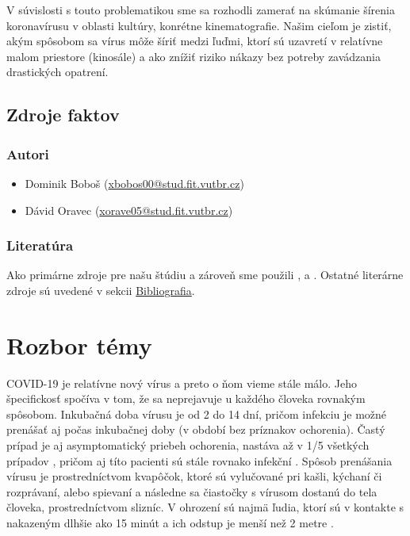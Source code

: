 \documentclass[a4paper, 11pt]{article}
\begin{document}
	\par V súvislosti s touto problematikou sme sa rozhodli zamerať na skúmanie šírenia koronavírusu v oblasti kultúry, konrétne kinematografie. Našim cieľom je zistiť, akým spôsobom sa vírus môže šíriť medzi ľuďmi, ktorí sú uzavretí v relatívne malom priestore (kinosále) a ako znížiť riziko nákazy bez potreby zavádzania drastických opatrení.
	
    	\subsection{Zdroje faktov}
    	    \subsubsection{Autori}
    	    \begin{itemize}
    	        \item Dominik Boboš (\href{mailto:xbobos00@stud.fit.vutbr.cz}{xbobos00@stud.fit.vutbr.cz})
    	        \item Dávid Oravec (\href{mailto:xorave05@stud.fit.vutbr.cz}{xorave05@stud.fit.vutbr.cz})
    	    \end{itemize}
    	    
    	    \subsubsection{Literatúra}
    	    Ako primárne zdroje pre našu štúdiu a zároveň  sme použili \cite{maxbrenner2020}, \cite{charlesconnor2020} a \cite{joslelieveldfrankhelleiset.al.2020}. Ostatné literárne zdroje sú uvedené v sekcii \hyperref[sec:bib]{Bibliografia}.
	    
	\section{Rozbor témy}
	\par COVID-19 je relatívne nový vírus a preto o ňom vieme stále málo. Jeho špecifickosť spočíva v tom, že sa neprejavuje u každého človeka rovnakým spôsobom. Inkubačná doba vírusu je od 2 do 14 dní, pričom infekciu je možné prenášať aj počas inkubačnej doby (v období bez príznakov ochorenia). Častý prípad je aj asymptomatický priebeh ochorenia, nastáva až v 1/5 všetkých prípadov \cite{asymptomatic}, pričom aj títo pacienti sú stále rovnako infekční \cite{asymptomaticinfectious}. Spôsob prenášania vírusu je prostredníctvom kvapôčok, ktoré sú vylučované pri kašli, kýchaní či rozprávaní, alebo spievaní a následne sa čiastočky s vírusom dostanú do tela človeka, prostredníctvom slizníc. V ohrození sú najmä ľudia, ktorí sú v kontakte s nakazeným dlhšie ako 15 minút a ich odstup je menší než 2 metre \cite{wikipedia}. 
	
\end{document}
